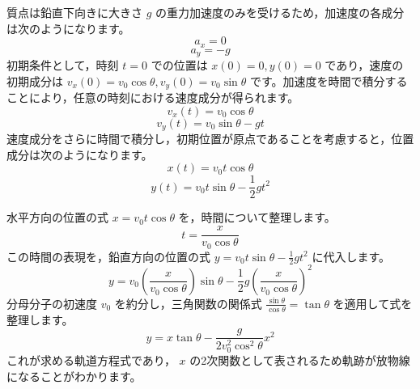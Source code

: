 \solutionheading
\begin{solutionparts}

質点は鉛直下向きに大きさ $g$ の重力加速度のみを受けるため，加速度の各成分は次のようになります。
\begin{equation*}
a_x = 0
\end{equation*}
\begin{equation*}
a_y = -g
\end{equation*}
初期条件として，時刻 $t=0$ での位置は $x(0) = 0, y(0) = 0$ であり，速度の初期成分は $v_x(0) = v_0 \cos\theta, v_y(0) = v_0 \sin\theta$ です。加速度を時間で積分することにより，任意の時刻における速度成分が得られます。
\begin{equation*}
v_x(t) = v_0 \cos\theta
\end{equation*}
\begin{equation*}
v_y(t) = v_0 \sin\theta - gt
\end{equation*}
速度成分をさらに時間で積分し，初期位置が原点であることを考慮すると，位置成分は次のようになります。
\begin{equation*}
x(t) = v_0 t \cos\theta
\end{equation*}
\begin{equation*}
y(t) = v_0 t \sin\theta - \frac{1}{2} gt^2
\end{equation*}

水平方向の位置の式 $x = v_0 t \cos\theta$ を，時間について整理します。
\begin{equation*}
t = \frac{x}{v_0 \cos\theta}
\end{equation*}
この時間の表現を，鉛直方向の位置の式 $y = v_0 t \sin\theta - \frac{1}{2} gt^2$ に代入します。
\begin{equation*}
y = v_0 \left( \frac{x}{v_0 \cos\theta} \right) \sin\theta - \frac{1}{2} g \left( \frac{x}{v_0 \cos\theta} \right)^2
\end{equation*}
分母分子の初速度 $v_0$ を約分し，三角関数の関係式 $\frac{\sin\theta}{\cos\theta} = \tan\theta$ を適用して式を整理します。
\begin{equation*}
y = x \tan\theta - \frac{g}{2 v_0^2 \cos^2\theta} x^2
\end{equation*}
これが求める軌道方程式であり， $x$ の2次関数として表されるため軌跡が放物線になることがわかります。


\end{solutionparts}
